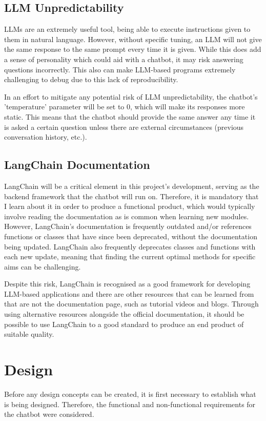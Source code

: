 \subsection{LLM Unpredictability}
LLMs are an extremely useful tool, being able to execute instructions given to them in natural language. However, without specific tuning, 
an LLM will not give the same response to the same prompt every time it is given. While this does add a sense of personality which could 
aid with a chatbot, it may risk answering questions incorrectly. This also can make LLM-based programs extremely challenging to debug due 
to this lack of reproducibility.

\para In an effort to mitigate any potential risk of LLM unpredictability, the chatbot's 'temperature' parameter will be set to 0, 
which will make its responses more static. This means that the chatbot should provide the same answer any time it is asked a certain 
question unless there are external circumstances (previous conversation history, etc.). 

\subsection{LangChain Documentation}
LangChain will be a critical element in this project's development, serving as the backend framework that the chatbot will run on.
Therefore, it is mandatory that I learn about it in order to produce a functional product, which would typically involve reading the 
documentation as is common when learning new modules. However, LangChain's documentation is frequently outdated and/or references 
functions or classes that have since been deprecated, without the documentation being updated. LangChain also frequently deprecates classes 
and functions with each new update, meaning that finding the current optimal methods for specific aims can be challenging.

\para Despite this risk, LangChain is recognised as a good framework for developing LLM-based applications and there are other 
resources that can be learned from that are not the documentation page, such as tutorial videos and blogs. Through using alternative 
resources alongside the official documentation, it should be possible to use LangChain to a good standard to produce an end product 
of suitable quality.

\pagebreak 

\section{Design}
Before any design concepts can be created, it is first necessary to establish what is being designed. Therefore, the functional and 
non-functional requirements for the chatbot were considered.

